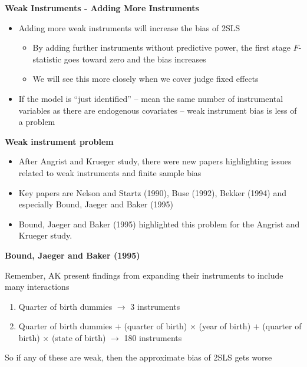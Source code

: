 \documentclass[notes=show]{beamer}
\begin{document}
\begin{frame}[plain]

	\begin{center}
	\textbf{Weak Instruments - Adding More Instruments}
	\end{center}
	
	\begin{itemize}
	\item Adding more weak instruments will increase the bias of 2SLS
		\begin{itemize}
		\item By adding further instruments without predictive power, the first stage $F$-statistic goes toward zero and the bias increases
		\item We will see this more closely when we cover judge fixed effects
		\end{itemize}
	\item If the model is ``just identified'' -- mean the same number of instrumental variables as there are endogenous covariates -- weak instrument bias is less of a problem
	\end{itemize}
\end{frame}

\begin{frame}[plain]
\begin{center}
\textbf{Weak instrument problem}
\end{center}

\begin{itemize}
	\item After Angrist and Krueger study, there were new papers highlighting issues related to weak instruments and finite sample bias
	\item Key papers are Nelson and Startz (1990), Buse (1992), Bekker (1994) and especially Bound, Jaeger and Baker (1995)
	\item Bound, Jaeger and Baker (1995) highlighted this problem for the Angrist and Krueger study.  
\end{itemize}

\end{frame}

\begin{frame}[plain]
\begin{center}
\textbf{Bound, Jaeger and Baker (1995)}
\end{center}

Remember, AK present findings from expanding their instruments to include many interactions
		\begin{enumerate}
		\item Quarter of birth dummies $\rightarrow$ 3 instruments
		\item Quarter of birth dummies $+$ (quarter of birth) $\times$ (year of birth) $+$ (quarter of birth) $\times$ (state of birth) $\rightarrow$ 180 instruments
		\end{enumerate}
So if any of these are weak, then the approximate bias of 2SLS gets worse

\end{frame}
\end{document}
